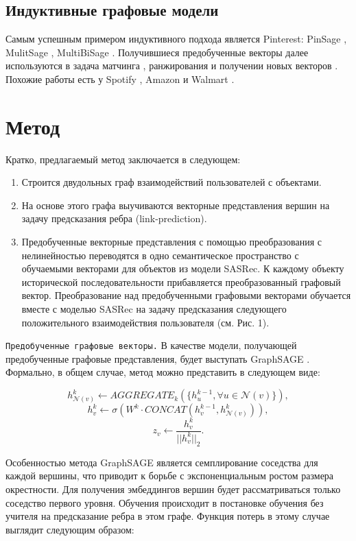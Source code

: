 \documentclass{article}
\begin{document}
\subsection{Индуктивные графовые модели}

Самым успешным примером индуктивного подхода является Pinterest: PinSage \cite{pinsage}, MulitSage \cite{multisage}, MultiBiSage \cite{multibisage}. Получившиеся 
предобученные векторы далее используются в задача матчинга \cite{pinnerformer}, ранжирования \cite{transact} и получении новых векторов \cite{itemsage}.
Похожие работы есть у Spotify \cite{podcastgnn}, Amazon \cite{amazonalexa} и Walmart \cite{walmart}.

\section{Метод}

Кратко, предлагаемый метод заключается в следующем:
\begin{enumerate}
	\item[\textbullet] Строится двудольных граф взаимодействий пользователей с объектами.
	\item[\textbullet] На основе этого графа выучиваются векторные представления вершин на задачу предсказания ребра (link-prediction).
	\item[\textbullet] Предобученные векторные представления с помощью преобразования с нелинейностью переводятся в одно семантическое пространство
с обучаемыми векторами для объектов из модели SASRec. К каждому объекту исторической последовательности прибавляется преобразованный графовый вектор.
Преобразование над предобученными графовыми векторами обучается вместе с моделью SASRec на задачу предсказания следующего положительного взаимодействия
пользователя (см. Рис. 1).
\end{enumerate}

\texttt{Предобученные графовые векторы.} В качестве модели, получающей предобученные графовые представления, будет выступать
GraphSAGE \cite{sage}. Формально, в общем случае, метод можно представить в следующем виде:

$$
h^k_{\mathcal{N}(v)} \leftarrow AGGREGATE_k(\{h^{k - 1}_u, \forall u \in \mathcal{N}(v)\}),
$$
$$
h^k_v \leftarrow \sigma(W^k \cdot CONCAT(h^{k - 1}_v, h^k_{\mathcal{N}(v)})), 
$$
$$
z_v \leftarrow \frac{h_v^k}{||h^k_v||_2}.
$$


Особенностью метода GraphSAGE является семплирование соседства для каждой вершины, что приводит к борьбе с экспоненциальным ростом размера окрестности.
Для получения эмбеддингов вершин будет рассматриваться только соседство первого уровня. 
Обучения происходит в постановке обучения без учителя на предсказание ребра в этом графе. Функция потерь в этому случае
выглядит следующим образом:
\end{document}

